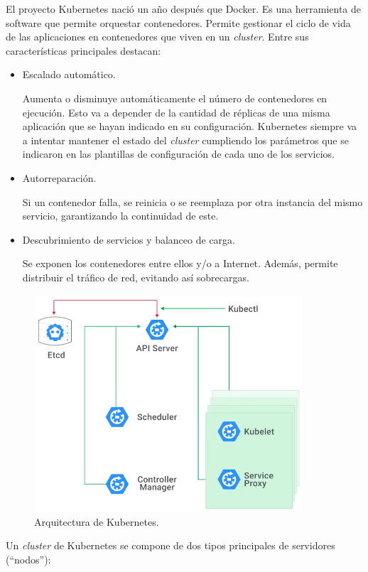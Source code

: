 El proyecto Kubernetes nació un año después que Docker. Es una herramienta de software que permite orquestar contenedores. Permite gestionar el ciclo de vida de las aplicaciones en contenedores que viven en un \textit{cluster}. Entre sus características principales destacan:

\begin{itemize}
  \item Escalado automático.

    Aumenta o disminuye automáticamente el número de contenedores en ejecución. Esto va a depender de la cantidad de réplicas de una misma aplicación que se hayan indicado en su configuración. Kubernetes siempre va a intentar mantener el estado del \textit{cluster} cumpliendo los parámetros que se indicaron en las plantillas de configuración de cada uno de los servicios.

  \item Autorreparación.

    Si un contenedor falla, se reinicia o se reemplaza por otra instancia del mismo servicio, garantizando la continuidad de este.

  \item Descubrimiento de servicios y balanceo de carga.

    Se exponen los contenedores entre ellos y/o a Internet. Además, permite distribuir el tráfico de red, evitando así sobrecargas.
\end{itemize}

\begin{figure}
  \centerline{\includegraphics[width=10cm]{figuras/k8s}}
  \caption{Arquitectura de Kubernetes.\cite{img:k8s}}
  \label{fig:k8s}
\end{figure}

Un \textit{cluster} de Kubernetes se compone de dos tipos principales de servidores (``nodos''):

